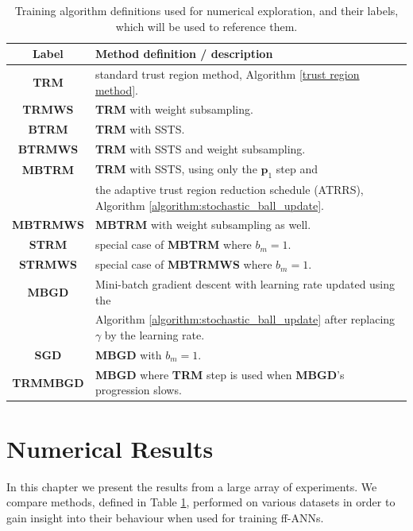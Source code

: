 \documentclass[letterpaper,12pt,titlepage,oneside,final]{book}
\begin{document}
	\begin{table}[h]
		\begin{center}
			\begin{tabular}{ |c|l| }  
				\hline
				\textbf{Label} & \textbf{Method definition / description}  \\
				\hline
				\textbf{TRM} &  standard trust region method, Algorithm \ref{trust region method}. \\
				\textbf{TRMWS} & \textbf{TRM} with weight subsampling. \\
				\textbf{BTRM} & \textbf{TRM} with SSTS.\\
				\textbf{BTRMWS} & \textbf{TRM} with SSTS and weight subsampling.  \\
				\textbf{MBTRM} & \textbf{TRM} with SSTS, using only the $\mathbf{p}_{1}$ step and \\ &
				the adaptive trust region reduction schedule (ATRRS), Algorithm \ref{algorithm:stochastic_ball_update}. \\ 
				\textbf{MBTRMWS} & \textbf{MBTRM} with weight subsampling as well. \\
				\textbf{STRM} & special case of \textbf{MBTRM} where $b_{m} = 1$. \\
				\textbf{STRMWS} & special case of \textbf{MBTRMWS} where $b_{m} = 1$. \\
				\textbf{MBGD} & Mini-batch gradient descent with learning rate updated using the \\ & Algorithm \ref{algorithm:stochastic_ball_update}  after replacing $\gamma$ by the learning rate.\\
				\textbf{SGD} & \textbf{MBGD} with $b_{m} = 1$. \\
				\textbf{TRMMBGD} & \textbf{MBGD} where \textbf{TRM} step is used when \textbf{MBGD}'s progression slows. \\
				\hline
			\end{tabular}
			\caption{Training algorithm definitions used for numerical exploration, and their labels, which will be used to reference them.}
			\label{table:algorithms}
		\end{center}
	\end{table}
	
	
	\chapter{Numerical Results}
	
	
	In this chapter we present the results from a large array of experiments. We compare methods, defined in Table \ref{table:algorithms}, performed on various datasets in order to gain insight into their behaviour when used for training ff-ANNs. 
	
\end{document}

